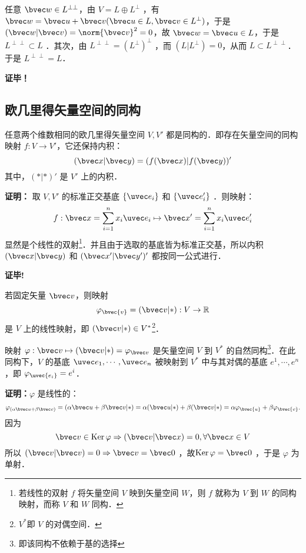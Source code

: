 任意 $\bvec w\in L^{\perp\perp}$，由 $V=L\oplus L^{\perp}$ ，有 $\bvec w=\bvec u+\bvec v(\bvec u\in L,\bvec v\in L^{\perp})$，于是 $(\bvec w|\bvec v)=\norm{\bvec v}^2=0$，故 $\bvec w=\bvec u\in L$，于是 $L^{\perp\perp}\subset L$ ．其次，由 $L^{\perp\perp}=(L^{\perp})^{\perp}$ ，而 $(L|L^{\perp})=0$，从而 $L\subset L^{\perp\perp}$．于是 $L^{\perp\perp}=L$．

\textbf{证毕！}
\subsection{欧几里得矢量空间的同构}
\begin{theorem}{}
任意两个维数相同的欧几里得矢量空间 $V,V'$ 都是同构的．即存在矢量空间的同构映射 $f:V\rightarrow V'$，它还保持内积：
\begin{equation}
(\bvec x|\bvec y)=(f(\bvec x)|f(\bvec y))'
\end{equation}
其中，$(*|*)'$ 是 $V'$ 上的内积．
\end{theorem}
\textbf{证明：} 取 $V,V'$ 的标准正交基底 $\{\uvec e_i\}$ 和 $\{\uvec e'_i\}$ ．则映射：
\begin{equation}
f:\bvec x=\sum_{i=1}^{n}x_i\uvec e_i\mapsto\bvec x'=\sum_{i=1}^{n}x_i\uvec e'_i
\end{equation}
显然是个线性的双射\footnote{若线性的双射 $f$ 将矢量空间 $V$ 映到矢量空间 $W$，则 $f$ 就称为 $V$ 到 $W$ 的同构映射，而称 $V$ 和 $W$ 同构．}．并且由于选取的基底皆为标准正交基，所以内积 $(\bvec x|\bvec y)$ 和 $(\bvec x'|\bvec y')'$ 都按同一公式进行．

\textbf{证毕!}

若固定矢量 $\bvec v$，则映射
\begin{equation}
\varphi_{\bvec{v}}=(\bvec v|*):V\rightarrow\mathbb{R}
\end{equation}
是 $V$ 上的线性映射，即 $(\bvec v|*)\in V^*$\footnote{$V^*$即 $V$ 的对偶空间．}．
\begin{theorem}{}\label{EVOIOG_the3}
映射 $\varphi:\bvec v\mapsto (\bvec v|*)=\varphi_{\bvec v}$ 是矢量空间 $V$ 到 $V^*$ 的自然同构\footnote{即该同构不依赖于基的选择}．在此同构下，$V$ 的基底 $\uvec e_1,\cdots,\uvec e_n$ 被映射到 $V^*$ 中与其对偶的基底 $e^1,\cdots,e^n$，即 $\varphi_{\uvec{e_i}}=e^i$．
\end{theorem}
\textbf{证明：}$\varphi$ 是线性的：
\begin{equation}
\varphi_{(\alpha\bvec u+\beta\bvec v)}=(\alpha\bvec u+\beta\bvec v|*)=\alpha(\bvec u|*)+\beta(\bvec v|*)=\alpha\varphi_{\bvec{u}}+\beta\varphi_{\bvec{v}}.
\end{equation}
因为 
\begin{equation}
\bvec v\in \mathrm{Ker}\,\varphi\Rightarrow(\bvec v|\bvec x)=0,\forall\bvec x\in V
\end{equation}
所以 $(\bvec v|\bvec v)=0\Rightarrow\bvec v=\bvec 0$ ，故$\mathrm{Ker}\,\varphi=\bvec 0$ ，于是 $\varphi$ 为单射．

